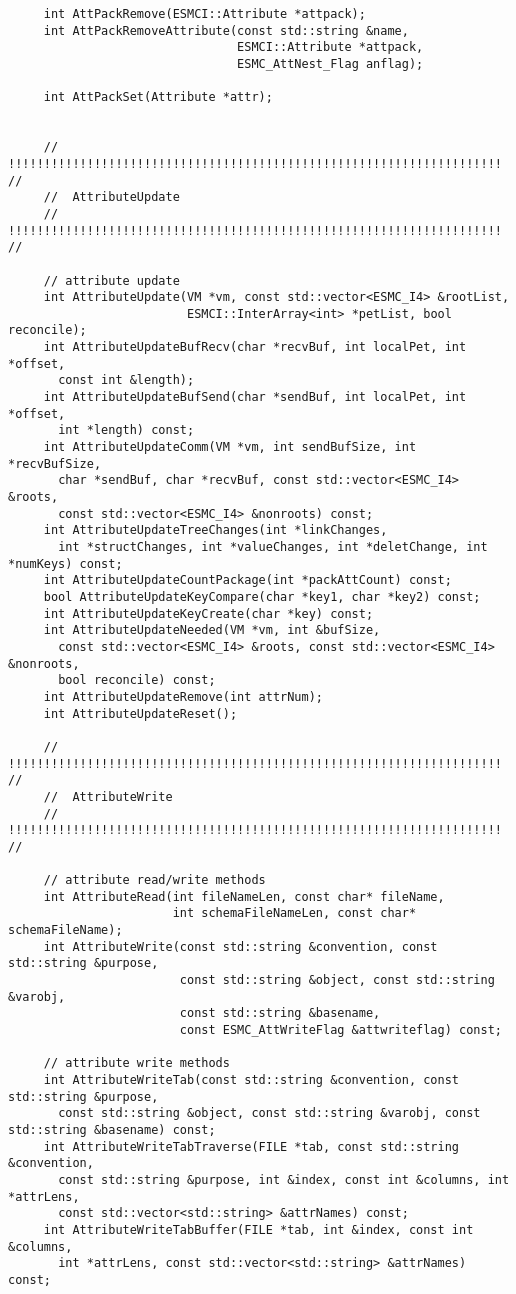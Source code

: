 \begin{verbatim}
     int AttPackRemove(ESMCI::Attribute *attpack);
     int AttPackRemoveAttribute(const std::string &name,
                                ESMCI::Attribute *attpack,
                                ESMC_AttNest_Flag anflag);
 
     int AttPackSet(Attribute *attr);
 
 
     // !!!!!!!!!!!!!!!!!!!!!!!!!!!!!!!!!!!!!!!!!!!!!!!!!!!!!!!!!!!!!!!!!!!!! //
     //  AttributeUpdate
     // !!!!!!!!!!!!!!!!!!!!!!!!!!!!!!!!!!!!!!!!!!!!!!!!!!!!!!!!!!!!!!!!!!!!! //
 
     // attribute update
     int AttributeUpdate(VM *vm, const std::vector<ESMC_I4> &rootList,
                         ESMCI::InterArray<int> *petList, bool reconcile);
     int AttributeUpdateBufRecv(char *recvBuf, int localPet, int *offset,
       const int &length);
     int AttributeUpdateBufSend(char *sendBuf, int localPet, int *offset,
       int *length) const;
     int AttributeUpdateComm(VM *vm, int sendBufSize, int *recvBufSize,
       char *sendBuf, char *recvBuf, const std::vector<ESMC_I4> &roots,
       const std::vector<ESMC_I4> &nonroots) const;
     int AttributeUpdateTreeChanges(int *linkChanges,
       int *structChanges, int *valueChanges, int *deletChange, int *numKeys) const;
     int AttributeUpdateCountPackage(int *packAttCount) const;
     bool AttributeUpdateKeyCompare(char *key1, char *key2) const;
     int AttributeUpdateKeyCreate(char *key) const;
     int AttributeUpdateNeeded(VM *vm, int &bufSize,
       const std::vector<ESMC_I4> &roots, const std::vector<ESMC_I4> &nonroots,
       bool reconcile) const;
     int AttributeUpdateRemove(int attrNum);
     int AttributeUpdateReset();
 
     // !!!!!!!!!!!!!!!!!!!!!!!!!!!!!!!!!!!!!!!!!!!!!!!!!!!!!!!!!!!!!!!!!!!!! //
     //  AttributeWrite
     // !!!!!!!!!!!!!!!!!!!!!!!!!!!!!!!!!!!!!!!!!!!!!!!!!!!!!!!!!!!!!!!!!!!!! //
 
     // attribute read/write methods
     int AttributeRead(int fileNameLen, const char* fileName,
                       int schemaFileNameLen, const char* schemaFileName);
     int AttributeWrite(const std::string &convention, const std::string &purpose,
                        const std::string &object, const std::string &varobj,
                        const std::string &basename,
                        const ESMC_AttWriteFlag &attwriteflag) const;
 
     // attribute write methods
     int AttributeWriteTab(const std::string &convention, const std::string &purpose,
       const std::string &object, const std::string &varobj, const std::string &basename) const;
     int AttributeWriteTabTraverse(FILE *tab, const std::string &convention,
       const std::string &purpose, int &index, const int &columns, int *attrLens,
       const std::vector<std::string> &attrNames) const;
     int AttributeWriteTabBuffer(FILE *tab, int &index, const int &columns,
       int *attrLens, const std::vector<std::string> &attrNames) const;
 

\end{verbatim}
